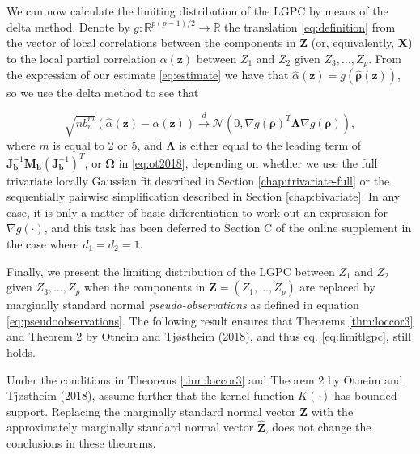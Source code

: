 \documentclass[
  12pt,
  letterpaper]{article}
\newcommand{\X}{\bm{X}}
\newcommand{\Z}{\bm{Z}}
\newcommand{\z}{\bm{z}}
\newcommand{\hZ}{\widehat{\bm{Z}}}
\newcommand{\frho}{\bm{\rho}}
\newcommand{\hfrho}{\widehat{\bm{\rho}}}
\newcommand{\hh}{\bm{b}}
\newcommand{\halpha}{\widehat{\alpha}}
\newcommand{\fOmega}{\bm{\Omega}}
\newcommand{\fLambda}{\bm{\Lambda}}
\newcommand{\Jb}{\bm{J}_{\hh}}
\newcommand{\Mb}{\bm{M}_{\hh}}
\theoremstyle{definition}
\theoremstyle{definition}
\theoremstyle{definition}
\theoremstyle{remark}
\let\BeginKnitrBlock\begin \let\EndKnitrBlock\end
\begin{document}
We can now calculate the limiting distribution of the LGPC by means of the delta method. Denote by \(g: \mathbb{R}^{p(p-1)/2} \rightarrow \mathbb{R}\) the translation \eqref{eq:definition} from the vector of local correlations between the components in \(\Z\) (or, equivalently, \(\X\)) to the local partial correlation \(\alpha(\z)\) between \(Z_1\) and \(Z_2\) given \(Z_3, \ldots, Z_p\). From the expression of our estimate \eqref{eq:estimate} we have that \(\halpha(\z) = g(\hfrho(\z))\), so we use the delta method to see that

\begin{equation}
\sqrt{nb_n^m}\left(\halpha(\z) - \alpha(\z)\right) \stackrel{d}{\rightarrow} \mathcal{N}\left(0, \nabla g(\frho)^T\fLambda\nabla g(\frho)\right),
\label{eq:limitlgpc}
\end{equation}
where \(m\) is equal to 2 or 5, and \(\fLambda\) is either equal to the leading term of \(\Jb^{-1}\Mb(\Jb^{-1})^T\), or \(\fOmega\) in \eqref{eq:ot2018}, depending on whether we use the full trivariate locally Gaussian fit described in Section \ref{chap:trivariate-full} or the sequentially pairwise simplification described in Section \ref{chap:bivariate}. In any case, it is only a matter of basic differentiation to work out an expression for \(\nabla g(\cdot)\), and this task has been deferred to Section C of the online supplement in the case where \(d_1 = d_2 = 1\).

Finally, we present the limiting distribution of the LGPC between \(Z_1\) and \(Z_2\) given \(Z_3, \ldots, Z_p\) when the components in \(\Z = (Z_1, \ldots, Z_p)\) are replaced by marginally standard normal \emph{pseudo-observations} as defined in equation \eqref{eq:pseudoobservations}. The following result ensures that Theorems \ref{thm:loccor3} and Theorem 2 by Otneim and Tjøstheim (\protect\hyperlink{ref-otneim2017conditional}{2018}), and thus eq. \eqref{eq:limitlgpc}, still holds.

\vspace{.5cm}

\BeginKnitrBlock{theorem}
\protect\hypertarget{thm:pseudo}{}{\label{thm:pseudo} }Under the conditions in Theorems \ref{thm:loccor3} and Theorem 2 by Otneim and Tjøstheim (\protect\hyperlink{ref-otneim2017conditional}{2018}), assume further that the kernel function \(K(\cdot)\) has bounded support. Replacing the marginally standard normal vector \(\Z\) with the approximately marginally standard normal vector \(\hZ\), does not change the conclusions in these theorems.
\EndKnitrBlock{theorem}
\end{document}
